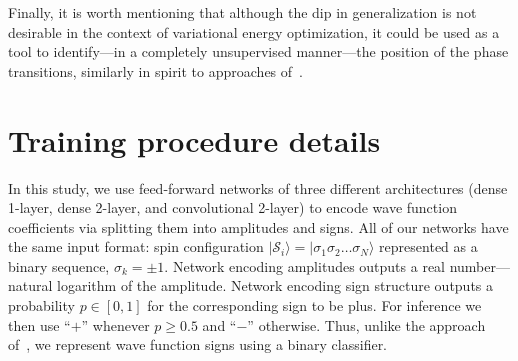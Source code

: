 Finally, it is worth mentioning that although the dip in generalization is not desirable in the context of variational energy optimization, it could be used as a tool to identify---in a completely unsupervised manner---the position of the phase transitions, similarly in spirit to approaches of~\cite{van2017learning,broecker2017quantum,hu2017discovering,doggen2018many}.


\section{Training procedure details}

In this study, we use feed-forward networks of three different architectures (dense 1-layer, dense 2-layer, and convolutional 2-layer) to encode wave function coefficients via splitting them into amplitudes and signs. All of our networks have the same input format: spin configuration $|\mathcal{S}_i\rangle = |\sigma_1 \sigma_2 \ldots \sigma_N\rangle$ represented as a binary sequence, $\sigma_k=\pm 1$. Network encoding amplitudes outputs a real number---natural logarithm of the amplitude. Network encoding sign structure outputs a probability $p \in [0, 1]$ for the corresponding sign to be plus. For inference we then use ``$+$'' whenever $p \geq 0.5$ and ``$-$'' otherwise. Thus, unlike the approach of~\cite{Carleo}, we represent wave function signs using a binary classifier.

